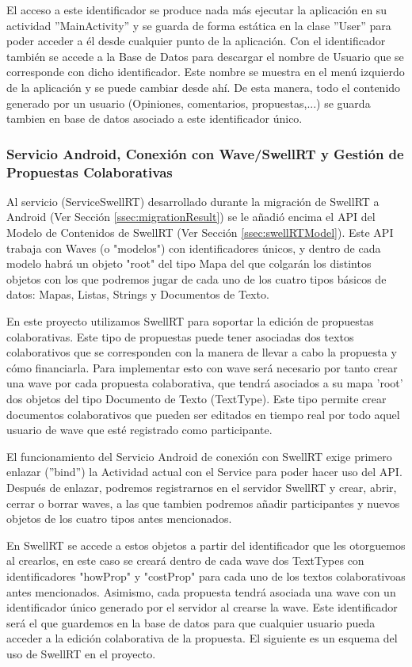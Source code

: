 		El acceso a este identificador se produce nada más ejecutar la aplicación en su actividad ''MainActivity'' y se guarda de forma estática en la clase ''User'' para poder acceder a él desde cualquier punto de la aplicación. Con el identificador también se accede a la Base de Datos para descargar el nombre de Usuario que se corresponde con dicho identificador. Este nombre se muestra en el menú izquierdo de la aplicación y se puede cambiar desde ahí. De esta manera, todo el contenido generado por un usuario (Opiniones, comentarios, propuestas,...) se guarda tambien en base de datos asociado a este identificador único.
		
	\subsubsection{Servicio Android, Conexión con Wave/SwellRT y Gestión de Propuestas Colaborativas}

		Al servicio (ServiceSwellRT) desarrollado durante la migración de SwellRT a Android (Ver Sección \ref{ssec:migrationResult}) se le añadió encima el API del Modelo de Contenidos de SwellRT (Ver Sección \ref{ssec:swellRTModel}). Este API trabaja con Waves (o "modelos") con identificadores únicos, y dentro de cada modelo habrá un objeto "root" del tipo Mapa del que colgarán los distintos objetos con los que podremos jugar de cada uno de los cuatro tipos básicos de datos: Mapas, Listas, Strings y Documentos de Texto.
		
		En este proyecto utilizamos SwellRT para soportar la edición de propuestas colaborativas. Este tipo de propuestas puede tener asociadas dos textos colaborativos que se corresponden con la manera de llevar a cabo la propuesta y cómo financiarla. Para implementar esto con wave será necesario por tanto crear una wave por cada propuesta colaborativa, que tendrá asociados a su mapa 'root' dos objetos del tipo Documento de Texto (TextType). Este tipo permite crear documentos colaborativos que pueden ser editados en tiempo real por todo aquel usuario de wave que esté registrado como participante. 
		
		El funcionamiento del Servicio Android de conexión con SwellRT exige primero enlazar (''bind'') la Actividad actual con el Service para poder hacer uso del API. Después de enlazar, podremos registrarnos en el servidor SwellRT y crear, abrir, cerrar o borrar waves, a las que tambien podremos añadir participantes y nuevos objetos de los cuatro tipos antes mencionados. 
		
		En SwellRT se accede a estos objetos a partir del identificador que les otorguemos al crearlos, en este caso se creará dentro de cada wave dos TextTypes con identificadores "howProp" y "costProp" para cada uno de los textos colaborativoas antes mencionados. Asimismo, cada propuesta tendrá asociada una wave con un identificador único generado por el servidor al crearse la wave. Este identificador será el que guardemos en la base de datos para que cualquier usuario pueda acceder a la edición colaborativa de la propuesta. El siguiente es un esquema del uso de SwellRT en el proyecto.
		

